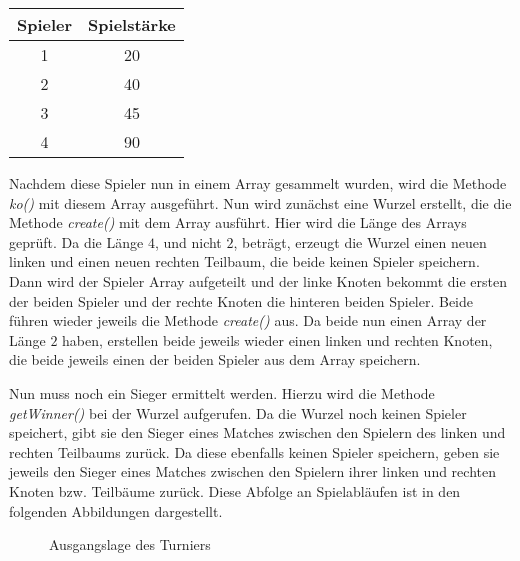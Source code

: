 \documentclass[a4paper, 12pt]{scrartcl}
\begin{document}
\begin{table}[H]
\centering
\begin{tabular}{@{}cc@{}}
\toprule
Spieler & Spielstärke \\ \midrule
1       & 20          \\
2       & 40          \\
3       & 45          \\
4       & 90          \\ \bottomrule
\end{tabular}
\end{table}

Nachdem diese Spieler nun in einem Array gesammelt wurden, wird die Methode \emph{ko()}
mit diesem Array ausgeführt. Nun wird zunächst eine Wurzel erstellt, die die
Methode \emph{create()} mit dem Array ausführt. Hier wird die Länge
des Arrays geprüft. Da die Länge $4$, und nicht $2$, beträgt, erzeugt die Wurzel
einen neuen linken und einen neuen rechten Teilbaum, die beide keinen Spieler
speichern. Dann wird der Spieler Array aufgeteilt und der linke Knoten bekommt
die ersten der beiden Spieler und der rechte Knoten die hinteren beiden
Spieler. Beide führen wieder jeweils die Methode \emph{create()} aus. Da beide nun
einen Array der Länge $2$ haben, erstellen beide jeweils wieder einen linken und
rechten Knoten, die beide jeweils einen der beiden Spieler aus dem Array
speichern. 

Nun muss noch ein Sieger ermittelt werden. Hierzu wird die Methode
\emph{getWinner()} bei der Wurzel aufgerufen. Da die Wurzel noch keinen Spieler speichert,
gibt sie den Sieger eines Matches zwischen den Spielern des linken und rechten
Teilbaums zurück. Da diese ebenfalls keinen Spieler speichern, geben sie jeweils
den Sieger eines Matches zwischen den Spielern ihrer linken und rechten Knoten bzw. Teilbäume zurück. Diese Abfolge an Spielabläufen ist in den folgenden Abbildungen dargestellt.

\begin{figure}[H]
    \centering
    \caption{Ausgangslage des Turniers}
\end{figure}
\end{document}

